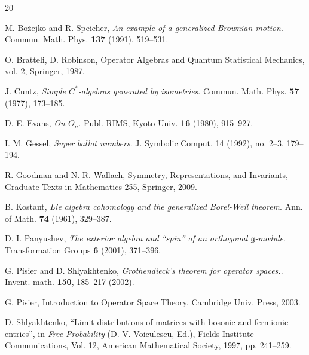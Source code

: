 \documentclass[11pt]{article}
\begin{document}
\begin{thebibliography}{20}

M. Bo\.zejko and R. Speicher, \textit{An example of a generalized Brownian motion}. Commun. Math. Phys. \textbf{137}
(1991), 519--531.

O. Bratteli, D. Robinson, {Operator Algebras and Quantum Statistical Mechanics}, vol. 2, Springer, 1987.

 J. Cuntz, \textit{Simple $C^*$-algebras generated by isometries}. Commun. Math. Phys. \textbf{57} (1977),
173--185.

 D. E. Evans, \textit{On $O_n$}. Publ. RIMS, Kyoto Univ. \textbf{16} (1980), 915--927.

I. M. Gessel,
\emph{Super ballot numbers}.
J. Symbolic Comput. 14 (1992), no. 2--3, 179--194.

R. Goodman and N. R. Wallach, Symmetry, Representations, and Invariants, Graduate Texts in Mathematics 255, Springer, 2009.



B. Kostant, \textit{Lie algebra cohomology and the generalized Borel-Weil theorem}. Ann. of Math.
\textbf{74} (1961), 329--387.


D. I. Panyushev, \textit{The exterior algebra and “spin” of an orthogonal $\mathfrak{g}$-module}. Transformation Groups \textbf{6} (2001), 371--396.


G. Pisier and D. Shlyakhtenko,  \emph{{Grothendieck’s} theorem for operator spaces.}. Invent. math. \textbf{150}, 185--217 (2002).

G. Pisier,
{Introduction to Operator Space Theory},
Cambridge Univ. Press, 2003.

D. Shlyakhtenko,
``Limit distributions of matrices with bosonic and fermionic entries'', in \textit{Free Probability} (D.-V. Voiculescu, Ed.),
Fields Institute Communications, Vol. 12, American Mathematical Society,  1997, pp. 241--259.


\end{thebibliography}
\end{document}
